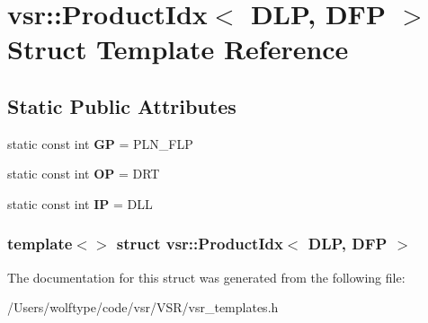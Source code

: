 \hypertarget{structvsr_1_1_product_idx_3_01_d_l_p_00_01_d_f_p_01_4}{\section{vsr\-:\-:Product\-Idx$<$ D\-L\-P, D\-F\-P $>$ Struct Template Reference}
\label{structvsr_1_1_product_idx_3_01_d_l_p_00_01_d_f_p_01_4}
}
\subsection*{Static Public Attributes}
\begin{DoxyCompactItemize}
\item 
\hypertarget{structvsr_1_1_product_idx_3_01_d_l_p_00_01_d_f_p_01_4_acae4c37cf879f5deb1eca271ed89ef67}{static const int {\bfseries G\-P} = P\-L\-N\-\_\-\-F\-L\-P}\label{structvsr_1_1_product_idx_3_01_d_l_p_00_01_d_f_p_01_4_acae4c37cf879f5deb1eca271ed89ef67}

\item 
\hypertarget{structvsr_1_1_product_idx_3_01_d_l_p_00_01_d_f_p_01_4_ac3051a534953bd2bf418720e9197f50c}{static const int {\bfseries O\-P} = D\-R\-T}\label{structvsr_1_1_product_idx_3_01_d_l_p_00_01_d_f_p_01_4_ac3051a534953bd2bf418720e9197f50c}

\item 
\hypertarget{structvsr_1_1_product_idx_3_01_d_l_p_00_01_d_f_p_01_4_ab3dec5e5a37a28a4671fc866a4c5cb7d}{static const int {\bfseries I\-P} = D\-L\-L}\label{structvsr_1_1_product_idx_3_01_d_l_p_00_01_d_f_p_01_4_ab3dec5e5a37a28a4671fc866a4c5cb7d}

\end{DoxyCompactItemize}
\subsubsection*{template$<$$>$ struct vsr\-::\-Product\-Idx$<$ D\-L\-P, D\-F\-P $>$}



The documentation for this struct was generated from the following file\-:\begin{DoxyCompactItemize}
\item 
/\-Users/wolftype/code/vsr/\-V\-S\-R/vsr\-\_\-templates.\-h\end{DoxyCompactItemize}
